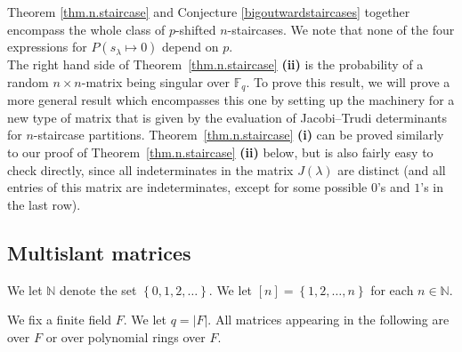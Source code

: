 \documentclass[numbers=enddot,12pt,final,onecolumn,notitlepage]{scrartcl}%
\theoremstyle{definition}
\newenvironment{noncompile}{}{}
\newcommand{\tup}[1]{\left( #1 \right)}
\theoremstyle{plainsl}
\begin{document}
Theorem \ref{thm.n.staircase} and Conjecture \ref{bigoutwardstaircases} together encompass the whole class of $p$-shifted $n$-staircases. We note that none of the four expressions for $P(s_{\lambda} \longmapsto 0)$ depend on $p$. \\

The right hand side of Theorem~\ref{thm.n.staircase} \textbf{(ii)}
is the probability of a random $n\times n$-matrix being singular over $\mathbb{F}_q$. To prove this result, we will prove a more general result which encompasses this one by setting up the machinery for a new type of matrix that is given by the evaluation of Jacobi--Trudi determinants for $n$-staircase partitions.  
Theorem~\ref{thm.n.staircase} \textbf{(i)} can be proved similarly to our proof of Theorem~\ref{thm.n.staircase} \textbf{(ii)} below,
but is also fairly easy to check directly, since all indeterminates
in the matrix $J\tup{\lambda}$ are distinct (and all entries of this
matrix are indeterminates, except for some possible $0$'s and $1$'s
in the last row).



\subsection{Multislant matrices}

We let $\mathbb{N}$ denote the set $\left\{  0,1,2,\ldots\right\}  $. We let
$\left[  n\right]  =\left\{  1,2,\ldots,n\right\}  $ for each $n\in\mathbb{N}$.

We fix a finite field $F$. We let $q=\left\vert F\right\vert $. All matrices
appearing in the following are over $F$ or over polynomial rings over $F$.

\end{document}
